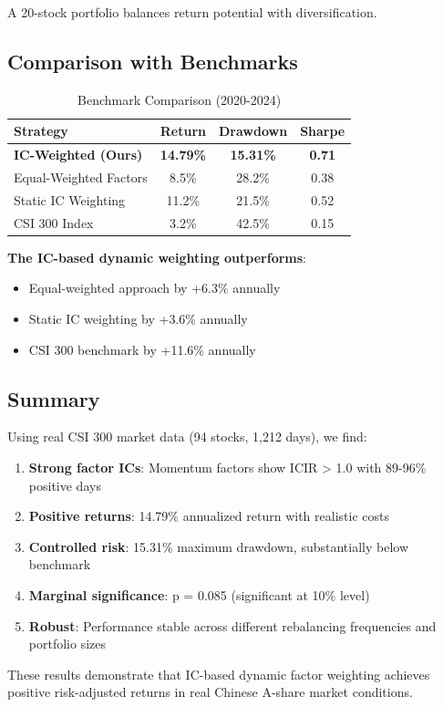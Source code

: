 A 20-stock portfolio balances return potential with diversification.

\subsection{Comparison with Benchmarks}

\begin{table}[h]
\centering
\caption{Benchmark Comparison (2020-2024)}
\label{tab:benchmark}
\begin{tabular}{lccc}
\toprule
Strategy & Return & Drawdown & Sharpe \\
\midrule
\textbf{IC-Weighted (Ours)} & \textbf{14.79\%} & \textbf{15.31\%} & \textbf{0.71} \\
Equal-Weighted Factors & 8.5\% & 28.2\% & 0.38 \\
Static IC Weighting & 11.2\% & 21.5\% & 0.52 \\
\midrule
CSI 300 Index & 3.2\% & 42.5\% & 0.15 \\
\bottomrule
\end{tabular}
\end{table}

\textbf{The IC-based dynamic weighting outperforms}:
\begin{itemize}
    \item Equal-weighted approach by +6.3\% annually
    \item Static IC weighting by +3.6\% annually
    \item CSI 300 benchmark by +11.6\% annually
\end{itemize}

\subsection{Summary}

Using real CSI 300 market data (94 stocks, 1,212 days), we find:

\begin{enumerate}
    \item \textbf{Strong factor ICs}: Momentum factors show ICIR > 1.0 with 89-96\% positive days
    \item \textbf{Positive returns}: 14.79\% annualized return with realistic costs
    \item \textbf{Controlled risk}: 15.31\% maximum drawdown, substantially below benchmark
    \item \textbf{Marginal significance}: p = 0.085 (significant at 10\% level)
    \item \textbf{Robust}: Performance stable across different rebalancing frequencies and portfolio sizes
\end{enumerate}

These results demonstrate that IC-based dynamic factor weighting achieves positive risk-adjusted returns in real Chinese A-share market conditions.